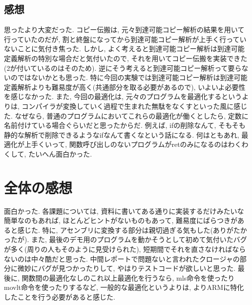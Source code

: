 \documentclass{jarticle}
\begin{document}
\subsection{感想}
思ったより大変だった. コピー伝搬は, 元々到達可能コピー解析の結果を用いて行っていたのだが, 割と終盤になってから到達可能コピー解析が上手く行っていないことに気付き焦った. しかし, よく考えると到達可能コピー解析は到達可能定義解析の特別な場合だと気付いたので, それを用いてコピー伝搬を実装できた(2が付いているのはそのため). 逆にそう考えると到達可能コピー解析って要らないのではないかとも思った. 特に今回の実験では到達可能コピー解析は到達可能定義解析よりも難易度が高く(共通部分を取る必要があるので), いよいよ必要性を感じなかった. また, 今回の最適化は, 元々のプログラムを最適化するというよりは, コンパイラが変換していく過程で生まれた無駄をなくすといった風に感じた. なぜなら, 普通のプログラムにおいてこれらの最適化が働くとしたら, 定数に名前付けている場合ぐらいだと思ったからだ. 例えば, ifの削除なんて, そもそも静的な解析で削除できるようなifなんて書くなという話になる. 何はともあれ, 最適化が上手くいって, 関数呼び出しのないプログラムがretのみになるのはわくわくして, たいへん面白かった.


\section{全体の感想}
面白かった. 各課題については, 資料に書いてある通りに実装するだけみたいな簡単なのもあれば, ほとんどヒントがないものもあって, 難易度にばらつきがあると感じた. 特に, アセンブリに変換する部分は親切過ぎる気もした(ありがたかったが). また, 最後のデモ用のプログラムを動かそうとして初めて気付いたバグが多く(周りの人もそのように見受けられた), 短期間でそれを直さなければならないのは中々酷だと思った. 中間レポートで問題ないと言われたクロージャの部分に微妙にバグが見つかったりして, やはりテストコードが欲しいと思った. 最後に, 関数間の最適化なしのこれ以上最適化を行うなら, mls命令を使ったりmovlt命令を使ったりするなど, 一般的な最適化というよりは, よりARMに特化したことを行う必要があると感じた.
\end{document}
